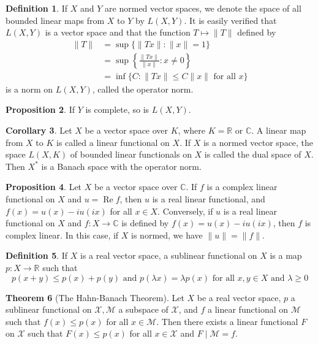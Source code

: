 \documentclass[12pt,a4paper]{book}
\theoremstyle{definition}
\newtheorem{defn}{Definition}[section]
\newtheorem{coro}[defn]{Corollary}
\newtheorem{theo}[defn]{Theorem}
\newtheorem{prop}[defn]{Proposition}
\begin{document}
\begin{defn}
    If $X$ and $Y$ are normed vector spaces, we denote the space of all bounded linear maps from $X$ to $Y$ by $L(X,Y)$. It is easily verified that $L(X,Y)$ is a vector space and that the function $T \mapsto\|T\|$ defined by
    $$
    \begin{aligned}
    \|T\| & =\sup \{\|T x\|:\|x\|=1\} \\
    & =\sup \left\{\frac{\|T x\|}{\|x\|}: x \neq 0\right\} \\
    & =\inf \{C:\|T x\| \leq C\|x\| \text { for all } x\}
    \end{aligned}
    $$
    is a norm on $L(X, Y)$, called the operator norm.
\end{defn}
\begin{prop}
    If $Y$ is complete, so is $L(X,Y)$.
\end{prop}
\begin{coro}
    Let $X$ be a vector space over $K$, where $K=\mathbb{R}$ or $\mathbb{C}$. A linear map from $X$ to $K$ is called a linear functional on $X$. If $X$ is a normed vector space, the space $L(X, K)$ of bounded linear functionals on $X$ is called the dual space of $X$. Then 
    $X^*$ is a Banach space with the operator norm.
\end{coro}
\begin{prop}
    Let $X$ be a vector space over $\mathbb{C}$. If $f$ is a complex linear functional on $X$ and $u=\operatorname{Re} f$, then $u$ is a real linear functional, and $f(x)=u(x)-i u(i x)$ for all $x \in X$. Conversely, if $u$ is a real linear functional on $X$ and $f: X \rightarrow \mathbb{C}$ is defined by $f(x)=u(x)-i u(i x)$, then $f$ is complex linear. In this case, if $X$ is normed, we have $\|u\|=\|f\|$.
\end{prop}
\begin{defn}
    If $X$ is a real vector space, a sublinear functional on $X$ is a map $p: X \rightarrow \mathbb{R}$ such that
    $$
    p(x+y) \leq p(x)+p(y) \text { and } p(\lambda x)=\lambda p(x) \text { for all } x, y \in X \text { and } \lambda \geq 0
    $$
\end{defn}
\begin{theo}[The Hahn-Banach Theorem]
    Let $X$ be a real vector space, $p$ a sublinear functional on $\mathcal{X}, \mathcal{M}$ a subspace of $\mathcal{X}$, and $f$ a linear functional on $\mathcal{M}$ such that $f(x) \leq p(x)$ for all $x \in \mathcal{M}$. Then there exists a linear functional $F$ on $\mathcal{X}$ such that $F(x) \leq p(x)$ for all $x \in \mathcal{X}$ and $F \mid \mathcal{M}=f$.
\end{theo}
\end{document}

